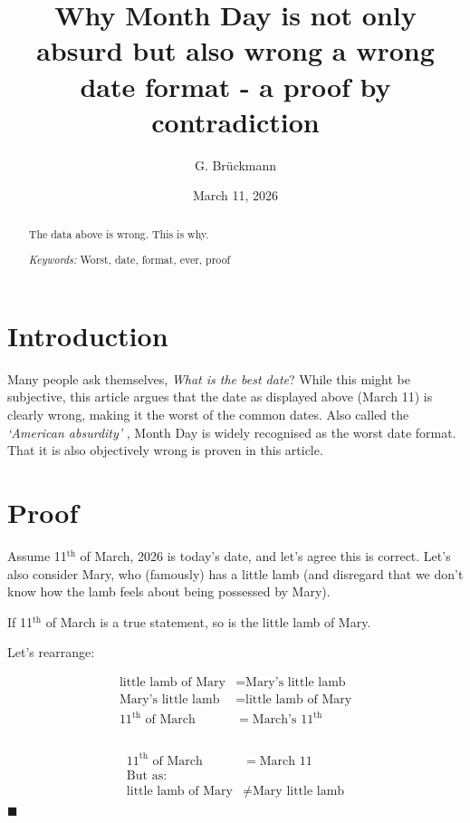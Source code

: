 \documentclass[12pt,longbibliography,draft]{article}
\title{Why Month Day is not only absurd but also wrong a wrong date format - a proof by contradiction}
\author{G. Brückmann}
\date{March 11, 2026}
\begin{document}
\maketitle

\begin{abstract}
The data above is wrong. This is why.\\ \par
\emph{Keywords: } Worst, date, format, ever, proof
\end{abstract}


\section{Introduction}
Many people ask themselves, \emph{What is the best date}? While this might be subjective, this article argues that the date as displayed above (March 11) is clearly wrong, making it the worst of the common dates. Also called the \emph{`American absurdity'} \citep{redditor}, Month Day is widely recognised as the worst date format. That it is also objectively wrong is proven in this article.

\section{Proof}


Assume 11$^{\text{th}}$ of March, 2026 is today's date, and let's agree this is correct. Let's also consider Mary, who (famously) has a little lamb (and disregard that we don't know how the lamb feels about being possessed by Mary). 


If 11$^{\text{th}}$ of March is a true statement, so is the little lamb of Mary.

Let's rearrange: 

\begin{align*} 
\text{little lamb of Mary} &=  \text{Mary's little lamb} \\
  \text{Mary's little lamb}  &= \text{little lamb of Mary}\\
11^{\text{th}}  \text{ of March} &=  \text{March's } 11^{\text{th}}\\
\end{align*}
\clearpage
{} \\ 
\begin{align*}
11^{\text{th}}  \text{ of March} &= \text{March } 11   \\ 
\text{But as:} \\
\text{little lamb of Mary} &\neq  \text{Mary little lamb}
\end{align*}
\hfill $\blacksquare$
\end{document}
